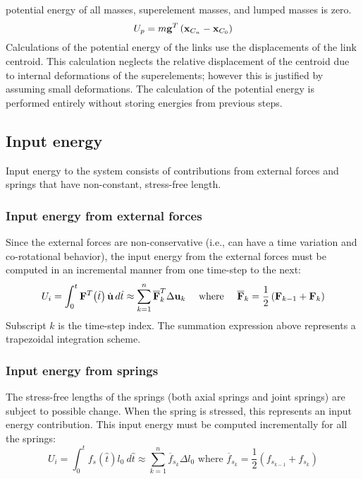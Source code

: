 potential energy of all masses, superelement masses, and lumped masses is zero.
%
\begin{equation}
U_{p} = m{\bf g}^{T}\left( {\bf x}_{C_n} - {\bf x}_{C_0}  \right)
\label{eqEC:86}
\end{equation}
%
\noindent
Calculations of the potential energy of the links use the displacements of 
the link centroid. This calculation neglects the relative displacement of 
the centroid due to internal deformations of the superelements; however 
this is justified by assuming small deformations. The 
calculation of the potential energy is performed entirely without 
storing energies from previous steps.

\subsection{Input energy}

Input energy to the system consists of contributions from external forces 
and springs that have non-constant, stress-free length.

\subsubsection{Input energy from external forces}

Since the external forces are non-conservative (i.e., can have a time variation 
and co-rotational behavior), the input energy from the external forces must 
be computed in an incremental manner from one time-step to the next:
%
\begin{equation}
 U_{i} = \int_{0}^{t} {{\bf F}^T\!\left( { {\hat t} }\right) \dot{\bf u} \,d{\hat t} 
\approx \sum_{k = 1}^{n} {\overline {{\bf F}}_{k}^{T}\Delta {\bf u}_{k} } } 
 \mbox{\ \ \ \ where\ \ \ \ }
\overline{{\bf F}}_{k}  = \frac{{1}}{{2}}\left( {\bf F}_{k - 1} + {\bf F}_{k}  \right)
\label{eqEC:87}
\end{equation}
%
Subscript $k$ is the time-step index. The summation expression 
above represents a trapezoidal integration scheme.

\subsubsection{Input energy from springs}

The stress-free lengths of the springs (both axial springs and joint springs) 
are subject to possible change. When the spring is 
stressed, this represents an input energy contribution. This input energy 
must be computed incrementally for all the springs:
%
\begin{equation}
 U_{i} = 
\int_{0}^{t} f_{s}({\hat t}) l_{0} \:d{\hat t} \approx \sum_{k = 1}^{n} 
\overline{f}_{s_{k}}  \Delta l_{0}  
 \mbox{\ \ \ \ where\ \ \ \ }
\overline {f}_{s_{k}} = 
\frac{{1}}{{2}}(f_{s_{k-1}} + f_{s_{k}})
\label{eqEC:88}
\end{equation}

